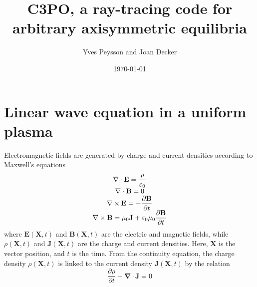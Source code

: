 \documentclass[a4paper,12pt]{article}%
\begin{document}
\title{C3PO, a ray-tracing code for arbitrary axisymmetric equilibria}
\author{Yves Peysson and Joan Decker }
\date{\today}
\maketitle
\tableofcontents

\section{\bigskip Linear wave equation in a uniform plasma}

Electromagnetic fields are generated by charge and current densities according
to Maxwell's equations%
\begin{equation}%
\begin{array}
[c]{c}%
\mathbf{\nabla}\cdot\mathbf{E}=\dfrac{\rho}{\varepsilon_{0}}\\
\mathbf{\nabla}\cdot\mathbf{B}=0\\
\mathbf{\nabla}\times\mathbf{E}=-\dfrac{\partial\mathbf{B}}{\partial t}\\
\mathbf{\nabla}\times\mathbf{B}=\mu_{0}\mathbf{J}+\varepsilon_{0}\mu_{0}%
\dfrac{\partial\mathbf{B}}{\partial t}%
\end{array}
\label{maxwell}%
\end{equation}
where $\mathbf{E}\left(  \mathbf{X},t\right)  $ and $\mathbf{B}\left(
\mathbf{X},t\right)  $ are the electric and magnetic fields, while
$\rho\left(  \mathbf{X},t\right)  $ and $\mathbf{J}\left(  \mathbf{X}%
,t\right)  $ are the charge and current densities. Here, $\mathbf{X}$ is the
vector position, and $t$ is the time. From the continuity equation, the charge
density $\rho\left(  \mathbf{X},t\right)  $ is linked to the current density
$\mathbf{J}\left(  \mathbf{X},t\right)  $ by the relation
\begin{equation}
\frac{\partial\rho}{\partial t}+\mathbf{\nabla}\cdot\mathbf{J}%
=0\label{continuity}%
\end{equation}
\end{document}
